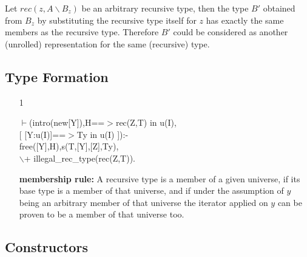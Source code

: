 \documentclass[11pt]{report}
\begin{document}
 Let $rec(z,A\backslash B_z)$ be an arbitrary recursive type, then the type
 $B'$ obtained from $B_z$ by substituting the recursive type itself 
 for $z$ has exactly the same members as the recursive type. 
 Therefore $B'$ could be considered as another (unrolled) 
 representation for the same (recursive) type. 
 
 \subsection{Type Formation}
 
 \begin{enumerate}
 \item[1]
\begin{sf}\begin{tabbing}
$\vdash$(intro(new[Y]),H==$>$rec(Z,T) in u(I), \\[-0.15ex]
\hspace{2em}[  [Y:u(I)]==$>$Ty in u(I) ]):-\\[-0.15ex]
\hspace{2em}free([Y],H),s(T,[Y],[Z],Ty),\\[-0.15ex]
\hspace{2em}$\backslash$+ illegal\_\hspace{0.1em}rec\_\hspace{0.1em}type(rec(Z,T)). 
\end{tabbing}\end{sf}

 {\bf membership rule:}
 A recursive type is a member of a given universe, if its base
 type is a member of that universe, and if under the assumption
 of $y$ being an arbitrary member of that universe 
 the iterator applied on $y$ can be proven to be a member of
 that universe too.
 \end{enumerate}
  
 \subsection{Constructors}
  
\end{document}
